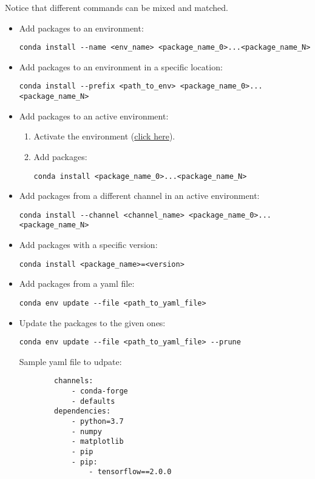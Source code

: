 Notice that different commands can be mixed and matched.
\begin{itemize}
    \item Add packages to an environment:
    \begin{verbatim}
conda install --name <env_name> <package_name_0>...<package_name_N>
    \end{verbatim}
    \item Add packages to an environment in a specific location:
    \begin{verbatim}
conda install --prefix <path_to_env> <package_name_0>...<package_name_N>
    \end{verbatim}
    \item Add packages to an active environment:
    \begin{enumerate}
        \item Activate the environment (\hyperref[conda:activateEnv]{click here}).
        \item Add packages: 
        \begin{verbatim}
conda install <package_name_0>...<package_name_N>
        \end{verbatim}
    \end{enumerate}
    \item Add packages from a different channel in an active environment:
    \begin{verbatim}
conda install --channel <channel_name> <package_name_0>...<package_name_N>
    \end{verbatim}
    \item Add packages with a specific version:
    \begin{verbatim}
conda install <package_name>=<version>
    \end{verbatim}
    \item Add packages from a yaml file:
    \begin{verbatim}
conda env update --file <path_to_yaml_file>
    \end{verbatim}
    \item Update the packages to the given ones:
    \begin{verbatim}
conda env update --file <path_to_yaml_file> --prune
    \end{verbatim}
    \newpage
    Sample yaml file to udpate:
    \begin{verbatim}
        channels:
            - conda-forge
            - defaults
        dependencies:
            - python=3.7
            - numpy
            - matplotlib
            - pip
            - pip:
                - tensorflow==2.0.0
            \end{verbatim}
\end{itemize}


